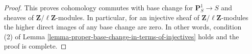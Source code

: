 \documentclass{amsart}
\theoremstyle{plain}
\theoremstyle{definition}
\theoremstyle{remark}
\numberwithin{equation}{subsection}
\begin{document}
\begin{proof}
\medskip\noindent
This proves cohomology commutes with base change for
$\mathbf{P}^1_S \to S$ and sheaves of $\mathbf{Z}/\ell\mathbf{Z}$-modules.
In particular, for an injective sheaf of $\mathbf{Z}/\ell\mathbf{Z}$-modules
the higher direct images of any base change are zero.
In other words, condition (2) of
Lemma \ref{lemma-proper-base-change-in-terms-of-injectives}
holds and the proof is complete.
\end{proof}
\end{document}
